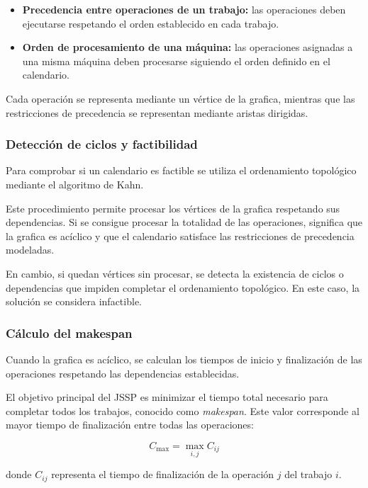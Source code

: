 \documentclass[12pt,a4paper]{article}
\begin{document}
\begin{itemize}
    \item \textbf{Precedencia entre operaciones de un trabajo:} las operaciones deben ejecutarse respetando el orden
    establecido en cada trabajo.

    \item \textbf{Orden de procesamiento de una máquina:} las operaciones asignadas a una misma máquina deben procesarse siguiendo el orden definido en el calendario.
\end{itemize}

Cada operación se representa mediante un vértice de la grafica, mientras que las restricciones de precedencia se representan mediante aristas dirigidas.

\subsubsection{Detección de ciclos y factibilidad}

Para comprobar si un calendario es factible se utiliza el ordenamiento topológico mediante el algoritmo de Kahn.

Este procedimiento permite procesar los vértices de la grafica respetando sus dependencias. Si se consigue procesar la totalidad de las operaciones, significa que la grafica es acíclico y que el calendario satisface las restricciones de precedencia modeladas.

En cambio, si quedan vértices sin procesar, se detecta la existencia de ciclos o dependencias que impiden completar el ordenamiento topológico. En este caso, la solución se considera infactible.

\subsubsection{Cálculo del makespan}

Cuando la grafica es acíclico, se calculan los tiempos de inicio y finalización de las operaciones respetando las dependencias establecidas.

El objetivo principal del JSSP es minimizar el tiempo total necesario para completar todos los trabajos, conocido como \textit{makespan}. Este valor corresponde al mayor tiempo de finalización entre todas las operaciones:

\[
C_{\max} = \max_{i,j} C_{ij}
\]

donde $C_{ij}$ representa el tiempo de finalización de la operación $j$ del trabajo $i$.
\end{document}
